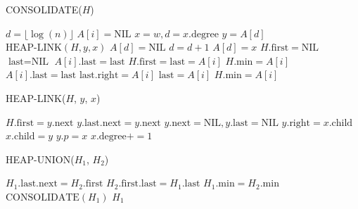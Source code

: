 \documentclass[paper=a4, fontsize=11pt]{scrartcl} %
\numberwithin{equation}{section} %
\numberwithin{figure}{section} %
\numberwithin{table}{section} %
\begin{document}
\begin{enumerate}[a]
\begin{addmargin}[3em]{0em}
    \begin{algorithm}[H]
      \caption{CONSOLIDATE($H$)}
      \begin{algorithmic}
        \State $d = \lfloor \log(n) \rfloor$
        \State $A[i] = \mbox{NIL}$
        \EndFor
        \State $x = w, d = x.\mbox{degree}$
        \State $y = A[d]$
        \EndIf
        \State $\mbox{HEAP-LINK}(H, y, x)$
        \State $A[d] = \mbox{NIL}$
        \State $d = d+1$
        \EndWhile
        \State $A[d] = x$
        \EndFor
        \State $H.\mbox{first} = \mbox{NIL}$
        \State $\mbox{last} = \mbox{NIL}$
        \State $A[i].\mbox{last} = \mbox{last}$
        \State $H.\mbox{first} = \mbox{last} = A[i]$
        \State $H.\mbox{min} = A[i]$
        \Else
        \State $A[i].\mbox{last} = \mbox{last}$
        \State $\mbox{last}.\mbox{right}=A[i]$
        \State $\mbox{last} = A[i]$
        \State $H.\mbox{min} = A[i]$
        \EndIf
        \EndIf
        \EndIf
        \EndFor
      \end{algorithmic}
    \end{algorithm}

    \begin{algorithm}[H]
      \caption{HEAP-LINK($H$, $y$, $x$)}
      \begin{algorithmic}
        \State $H.\mbox{first} = y.\mbox{next}$
        \Else
        \State $y.\mbox{last}.\mbox{next} = y.\mbox{next}$
        \EndIf
        \State $y.\mbox{next} = \mbox{NIL}, y.\mbox{last} = \mbox{NIL}$
        \State $y.\mbox{right} = x.\mbox{child}$
        \State $x.\mbox{child} = y$
        \State $y.p = x$
        \State $x.\mbox{degree} += 1$
      \end{algorithmic}
    \end{algorithm}

    \begin{algorithm}[H]
      \caption{HEAP-UNION($H_1$, $H_2$)}
      \begin{algorithmic}
        \State $H_1.\mbox{last}.\mbox{next} = H_2.\mbox{first}$
        \State $H_2.\mbox{first}.\mbox{last} = H_1.\mbox{last}$
        \State $H_1.\mbox{min} = H_2.\mbox{min}$
        \State $\mbox{CONSOLIDATE}(H_1)$ 
        \EndIf
        \State\Return $H_1$
      \end{algorithmic}
    \end{algorithm}


\end{addmargin}
\end{enumerate}
\end{document}
